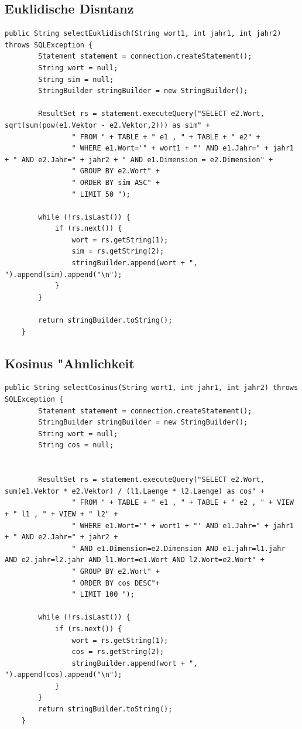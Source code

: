 \subsection{Euklidische Disntanz}
\begin{lstlisting}[style=Java]
public String selectEuklidisch(String wort1, int jahr1, int jahr2) throws SQLException {
        Statement statement = connection.createStatement();
        String wort = null;
        String sim = null;
        StringBuilder stringBuilder = new StringBuilder();

        ResultSet rs = statement.executeQuery("SELECT e2.Wort, sqrt(sum(pow(e1.Vektor - e2.Vektor,2))) as sim" +
                " FROM " + TABLE + " e1 , " + TABLE + " e2" +
                " WHERE e1.Wort='" + wort1 + "' AND e1.Jahr=" + jahr1 + " AND e2.Jahr=" + jahr2 + " AND e1.Dimension = e2.Dimension" +
                " GROUP BY e2.Wort" +
                " ORDER BY sim ASC" +
                " LIMIT 50 ");

        while (!rs.isLast()) {
            if (rs.next()) {
                wort = rs.getString(1);
                sim = rs.getString(2);
                stringBuilder.append(wort + ", ").append(sim).append("\n");
            }
        }

        return stringBuilder.toString();
    }
\end{lstlisting}


\subsection{Kosinus "Ahnlichkeit}
\begin{lstlisting}[style=Java]
public String selectCosinus(String wort1, int jahr1, int jahr2) throws SQLException {
        Statement statement = connection.createStatement();
        StringBuilder stringBuilder = new StringBuilder();
        String wort = null;
        String cos = null;


        ResultSet rs = statement.executeQuery("SELECT e2.Wort, sum(e1.Vektor * e2.Vektor) / (l1.Laenge * l2.Laenge) as cos" +
                " FROM " + TABLE + " e1 , " + TABLE + " e2 , " + VIEW + " l1 , " + VIEW + " l2" +
                " WHERE e1.Wort='" + wort1 + "' AND e1.Jahr=" + jahr1 + " AND e2.Jahr=" + jahr2 +
                " AND e1.Dimension=e2.Dimension AND e1.jahr=l1.jahr AND e2.jahr=l2.jahr AND l1.Wort=e1.Wort AND l2.Wort=e2.Wort" +
                " GROUP BY e2.Wort" +
                " ORDER BY cos DESC"+
                " LIMIT 100 ");

        while (!rs.isLast()) {
            if (rs.next()) {
                wort = rs.getString(1);
                cos = rs.getString(2);
                stringBuilder.append(wort + ", ").append(cos).append("\n");
            }
        }
        return stringBuilder.toString();
    }
\end{lstlisting}

